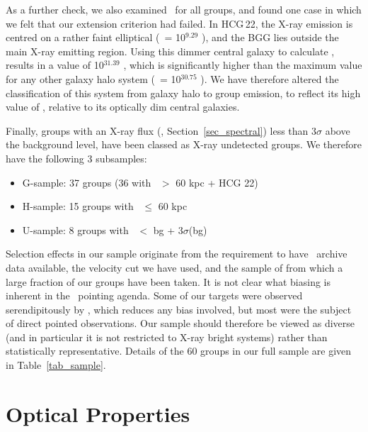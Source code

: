 \documentclass[usenatbib]{mn2e}
\begin{document}
As a further check, we also examined \LXpLBGG\ for all groups, and found one case
in which we felt that our extension criterion had failed.  In HCG\,22, the X-ray
emission is centred on a rather faint elliptical (\LB\ = 10$^{9.29}$ \Lsol), and
the BGG lies outside the main X-ray emitting region.  Using this dimmer central
galaxy to calculate \LXpLB, results in a value of 10$^{31.39}$ \ergpspLsol, which
is significantly higher than the maximum value for any other galaxy halo system
(\LXpLBGG\ = 10$^{30.75}$ \ergpspLsol).  We have therefore altered the
classification of this system from galaxy halo to group emission, to reflect its
high value of \LX, relative to its optically dim central galaxies.

Finally, groups with an X-ray flux (\LX, Section~\ref{sec_spectral}) less than
3$\sigma$ above the background level, have been classed as X-ray undetected
groups. We therefore have the following 3 subsamples:

\begin{itemize}
\item G-sample: 37 groups (36 with \rext\ $>$ 60 kpc + HCG 22)
\item H-sample: 15 groups with \rext\ $\leq$ 60 kpc
\item U-sample: 8 groups with \LX\ $<$ bg + 3$\sigma$(bg)
\end{itemize}

Selection effects in our sample originate from the requirement to have
\ROSAT\ archive data available, the velocity cut we have used, and the sample of
\citet{helsdon00a} from which a large fraction of our groups have been taken.  It
is not clear what biasing is inherent in the \ROSAT\ pointing agenda. Some of our
targets were observed serendipitously by \ROSAT, which reduces any bias involved,
but most were the subject of direct pointed observations. Our sample should
therefore be viewed as diverse (and in particular it is not restricted to
X-ray bright systems) rather than statistically representative. Details of the
60 groups in our full sample are given in Table~\ref{tab_sample}.




\section{Optical Properties}
\label{sec_optical}
\end{document}

